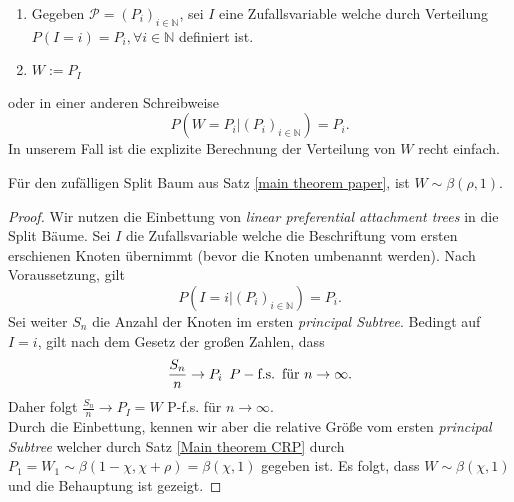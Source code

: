\begin{enumerate}
    \item Gegeben $\mathcal{P} = (P_i)_{i \in \mathbb{N}}$, sei $I$ eine Zufallsvariable welche durch Verteilung $P(I=i) = P_i, \forall i \in \mathbb{N}$ definiert ist.
    \item $W:= P_I$ 
\end{enumerate}
oder in einer anderen Schreibweise
\[
    P(W = P_i| (P_i)_{i \in \mathbb{N}}) = P_i.
\]
In unserem Fall ist die explizite Berechnung der Verteilung von $W$ recht einfach.
\begin{theorem}
    \label{Verteilung W}
    Für den zufälligen Split Baum aus Satz \ref{main theorem paper}, ist $W \sim \beta(\rho,1)$.
\end{theorem} 
\begin{proof}
    Wir nutzen die Einbettung von \textit{linear preferential attachment trees} in die Split Bäume. Sei $I$ die Zufallsvariable welche die Beschriftung vom ersten erschienen Knoten übernimmt (bevor die Knoten umbenannt werden). Nach Voraussetzung, gilt 
    \[
    P(I=i|(P_i)_{i \in \mathbb{N}}) = P_i.  
    \] 
    Sei weiter $S_n$ die Anzahl der Knoten im ersten \textit{principal Subtree}. Bedingt auf $I=i$, gilt nach dem Gesetz der großen Zahlen, dass 
    \[
    \frac{S_n}{n} \rightarrow P_i \hspace{5pt} P-\textnormal{f.s.} \hspace{5pt} \textnormal{für } n \to \infty.
    \] 
    Daher folgt $\frac{S_n}{n} \rightarrow P_I = W$ P-f.s. für $n \to \infty$.\\
    Durch die Einbettung, kennen wir aber die relative Größe vom ersten \textit{principal Subtree} welcher durch Satz \ref{Main theorem CRP} durch $P_1 = W_1 \sim \beta(1-\chi,\chi + \rho) = \beta(\chi, 1)$ gegeben ist. Es folgt, dass $W \sim \beta(\chi,1)$ und die Behauptung ist gezeigt.
\end{proof}
